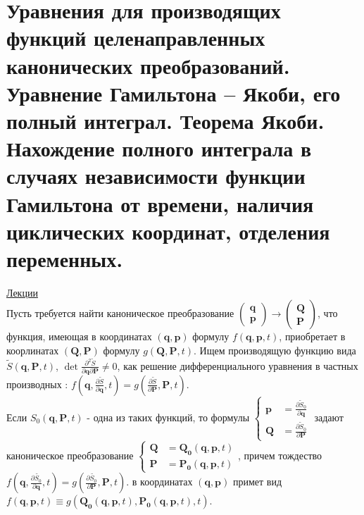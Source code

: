 \documentclass[specialist, subf, href, colorlinks=true, 12pt, times, mtpro, final]{disser}
\theoremstyle{definition}
\begin{document}
 \section{Уравнения для производящих функций целенаправленных канонических преобразований. Уравнение Гамильтона – Якоби, его полный интеграл. Теорема Якоби. Нахождение полного интеграла в случаях независимости функции Гамильтона от времени, наличия циклических координат, отделения переменных.}
     \label{20}
    \hyperlink {lects.32}{Лекции} \\
    Пусть требуется найти каноническое преобразование $\left (
\begin{matrix}
\mathbf{q}\\ \mathbf{p}
\end{matrix}
\right ) \rightarrow \left (
\begin{matrix}
\mathbf{Q}\\ \mathbf{P}
\end{matrix}
\right )$, что функция, имеющая в координатах $(\mathbf{q}, \mathbf{p})$ формулу $f(\mathbf{q}, \mathbf{p}, t)$, приобретает в коорлинатах $(\mathbf{Q}, \mathbf{P})$ формулу $g(\mathbf{Q}, \mathbf{P}, t)$. Ищем производящую функцию вида $\tilde{S}(\mathbf{q},\mathbf{P}, t)$, $\det \frac{\partial^2 \tilde{S}}{\partial \mathbf{q} \partial \mathbf{P}} \neq 0$, как решение дифференциального уравнения в частных производных : $f(\mathbf{q}, \frac{\partial \tilde{S}}{\partial \mathbf{q}}, t) = g(\frac{\partial \tilde{S}}{\partial \mathbf{P}}, \mathbf{P}, t).$\\
Если $S_0(\mathbf{q},\mathbf{P}, t)$ - одна из таких функций, то формулы $\left \{
\begin{matrix}
\mathbf{p}&= \frac{\partial \tilde S_0}{\partial \mathbf{q}}\\
\mathbf{Q} &= \frac{\partial \tilde S_0}{\partial \mathbf{P}}
\end{matrix}
\right .$ задают каноническое преобразование $\left \lbrace
\begin{matrix}
\mathbf{Q} &= \mathbf{Q_0}(\mathbf{q}, \mathbf{p}, t)\\
\mathbf{P} &= \mathbf{P_0}(\mathbf{q}, \mathbf{p}, t) 
\end{matrix}
\right .$, причем тождество $f(\mathbf{q}, \frac{\partial \tilde{S_0}}{\partial \mathbf{q}}, t) = g(\frac{\partial \tilde{S_0}}{\partial \mathbf{P}}, \mathbf{P}, t).$ в координатах $(\mathbf{q}, \mathbf{p})$ примет вид \\
$f(\mathbf{q}, \mathbf{p}, t) \equiv g( \mathbf{Q_0}(\mathbf{q}, \mathbf{p}, t),  \mathbf{P_0}(\mathbf{q}, \mathbf{p}, t), t).$\\
\end{document}
